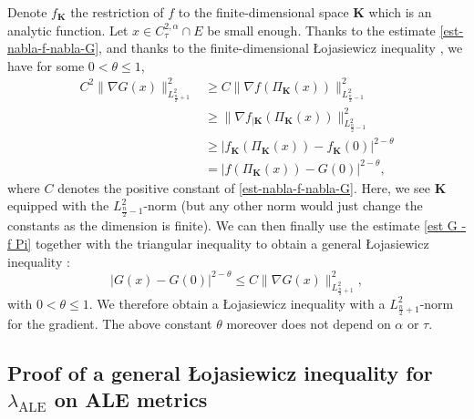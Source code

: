 \documentclass[a4paper,11pt,reqno]{amsart}
\numberwithin{equation}{section}
\begin{document}
	Denote $f_\mathbf{K}$ the restriction of $f$ to the finite-dimensional space $\mathbf{K}$ which is an analytic function. Let $x\in C^{2,\alpha}_\tau\cap E$ be small enough. Thanks to the estimate \eqref{est-nabla-f-nabla-G}, and thanks to the finite-dimensional \L{}ojasiewicz inequality \cite{loj}, we have for some $0<\theta\leq 1$,
	\begin{align}
	C^2\|\nabla G(x)\|_{L^2_{\frac{n}{2}+1}}^2&\geq C\|\nabla f (\Pi_\mathbf{K}(x))\|_{L^2_{\frac{n}{2}-1}}^2\\
	&\geq \|\nabla f_{|\mathbf{K}}(\Pi_\mathbf{K}(x))\|_{L^2_{\frac{n}{2}-1}}^2\\
	&\geq |f_\mathbf{K}(\Pi_\mathbf{K}(x))-f_\mathbf{K}(0)|^{2-\theta}\\
	&=|f(\Pi_\mathbf{K}(x))-G(0)|^{2-\theta},
	\end{align}
	where  $C$ denotes the positive constant of \eqref{est-nabla-f-nabla-G}. Here, we see $\mathbf{K}$ equipped with the $L^2_{\frac{n}{2}-1}$-norm (but any other norm would just change the constants as the dimension is finite). We can then finally use the estimate \eqref{est G - f Pi} together with the triangular inequality to obtain a general \L{}ojasiewicz inequality : 
	\begin{equation}
	|G(x)-G(0)|^{2-\theta}\leq C\|\nabla G(x)\|^2_{L^2_{\frac{n}{2}+1}},\label{loja L2-n/2+1}
	\end{equation}
	with $0<\theta\leq 1$. We therefore obtain a \L{}ojasiewicz inequality with a $L^2_{\frac{n}{2}+1}$-norm for the gradient.  The above constant $\theta$ moreover does not depend on $\alpha$ or $\tau$.
	
	\subsection{Proof of a general \L{}ojasiewicz inequality for $\lambda_{\operatorname{ALE}}$ on ALE metrics}\label{sec-proof-gal-loja}~~\\
	
\end{document}
